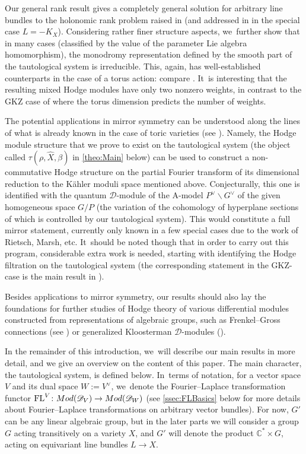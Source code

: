 \documentclass[11pt]{article}
\let\mathds\mathbb
\newcommand{\dC}{{\mathds C}}\let\C\dC
\newcommand{\cD}{\mathscr{D}}
\DeclareMathOperator{\FL}{\textup{FL}}
\begin{document}
Our general rank result gives a completely general solution for
arbitrary line bundles to the holonomic rank problem raised in
\cite{Bloch_HolRankProb} (and addressed in \cite{HuangLianZhu} in the
special case $L=-K_X$). Considering rather finer structure aspects, we~further show that in many cases (classified by the value of the
parameter Lie algebra homomorphism), the monodromy representation
defined by the smooth part of the tautological system is irreducible.
This, again, has well-established counterparts in the
case of a torus action: compare
\cite{GKZ90,W-taka,Saito11,SW12,Beukers}. It~is interesting that the resulting mixed Hodge modules have only two nonzero weights, in contrast to the GKZ case of \cite{ReichWalth-Weight} where the torus dimension predicts the number of weights.\enlargethispage{\baselineskip}

The potential applications in mirror symmetry can be understood along the lines of what is already known in the case of toric varieties (see \cite{RS10, RS12, RS20}). Namely, the Hodge module structure that we prove to exist on the tautological system (the object called $\tau(\rho, \hat{X}, \beta)$ in \cref{theo:Main} below) can be used to construct a non-commutative Hodge structure on the partial Fourier transform of its dimensional reduction to the Kähler moduli space mentioned above. Conjecturally, this one is identified with the quantum $\cD$\nobreakdash-mod\-ule of the A-model $P^\vee\backslash G^\vee$ of the given homogeneous space $G/P$ (the variation of the cohomology of hyperplane sections of which is controlled by our tautological system). This would constitute a full mirror statement, currently only known in a few special cases due to the work of Rietsch, Marsh, etc. It~should be noted though that in order to carry out this program, considerable extra work is needed, starting with identifying the Hodge filtration on the tautological system (the corresponding statement in the GKZ-case is the main result in \cite{RS20}).

Besides applications to
mirror symmetry, our results should also lay the foundations for
further studies of Hodge theory of various differential modules
constructed from representations of algebraic groups, such as
Frenkel--Gross connections (see \cite{FrenkelGross}) or generalized
Kloosterman $\cD$\nobreakdash-mod\-ules (\cite{HeinlothNgoYun}).

In the remainder of this introduction, we~will describe our main results in more detail, and we give an overview on the content of this paper. The main character, the tautological system, is defined below. In~terms of notation, for a vector space $V$ and its dual space $W:=V^\vee$, we~denote the Fourier--Laplace transformation functor
$\FL^V\colon \textup{Mod}(\mathscr{D}_V)\to\textup{Mod}(\mathscr{D}_W)$ (see \cref{ssec:FLBasics} below for more details about Fourier--Laplace transformations on arbitrary vector bundles). For now, $G'$ can be any linear algebraic group, but in the
later parts we will consider a group $G$ acting transitively on a variety $X$, and $G'$ will denote the
product $\dC^*\times G$, acting on equivariant line bundles $L\to X$.
\end{document}
